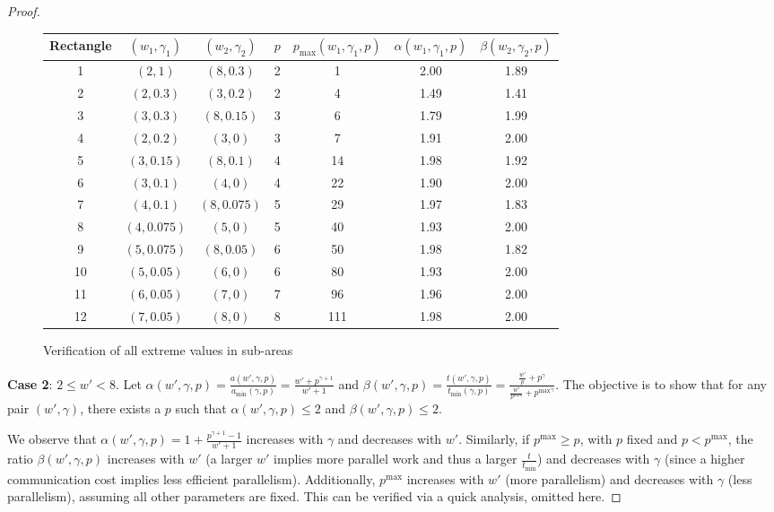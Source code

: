 \documentclass{article}
\begin{document}
\begin{proof}
\begin{figure}
\center
\begin{tabular}{|c|c|c|c|c|c|c|}
\hline
Rectangle & $(w_1,\gamma_1)$ & $(w_2,\gamma_2)$ & $p$ & $p_{\max}(w_1,\gamma_1,p) $& $\alpha(w_1,\gamma_1,p)$ & $\beta(w_2,\gamma_2,p)$ \\
\hline
1 & $(2,1)$ & $(8,0.3)$ & 2 &1 & 2.00 & 1.89 \\
2 & $(2,0.3)$ & $(3,0.2)$ & 2 &4 & 1.49 & 1.41 \\
3 & $(3,0.3)$ & $(8,0.15)$ & 3 &6 & 1.79 & 1.99 \\
4 & $(2,0.2)$ & $(3,0)$ & 3 &7 & 1.91 & 2.00 \\
5 & $(3,0.15)$ & $(8,0.1)$ & 4 &14 & 1.98 & 1.92 \\
6 & $(3,0.1)$ & $(4,0)$ & 4 &22 & 1.90 & 2.00 \\
7 & $(4,0.1)$ & $(8,0.075)$ & 5 &29 & 1.97 & 1.83 \\
8 & $(4,0.075)$ & $(5,0)$ & 5 &40 & 1.93 & 2.00 \\
9 & $(5,0.075)$ & $(8,0.05)$ & 6 &50 & 1.98 & 1.82 \\
10 & $(5,0.05)$ & $(6,0)$ & 6 &80 & 1.93 & 2.00 \\
11 & $(6,0.05)$ & $(7,0)$ & 7 &96 & 1.96 & 2.00 \\
12 & $(7,0.05)$ & $(8,0)$ & 8 &111 & 1.98 & 2.00 \\
\hline
\end{tabular}
\caption{Verification of all extreme values in sub-areas}
\label{fig.verif}
\end{figure}\textbf{Case 2}: $2 \leq w' < 8$.  
Let  $\alpha(w',\gamma,p)= \frac{a(w',\gamma,p)}{a_{\min}(\gamma,p)} = \frac{w' + p^{\gamma+1}}{w' + 1}$ and $\beta(w',\gamma,p) = \frac{t(w',\gamma,p)}{t_{\min}(\gamma,p)} = \frac{\frac{w'}{p} + p^\gamma}{\frac{w'}{p^{\max}} + {p^{\max}}^\gamma}$. The objective is to show that for any pair $(w',\gamma)$, there exists a $p$ such that $\alpha(w',\gamma,p) \leq 2$ and $\beta(w',\gamma,p) \leq 2$.

We observe that $\alpha(w',\gamma,p) = 1 + \frac{p^{\gamma+1} - 1}{w' + 1}$ increases with $\gamma$ and decreases with $w'$.  
Similarly, if $p^{\max} \geq p$, with $p$ fixed and $p < p^{\max}$, the ratio $\beta(w',\gamma,p)$ increases with $w'$ (a larger $w'$ implies more parallel work and thus a larger $\frac{t}{t_{\min}}$) and decreases with $\gamma$ (since a higher communication cost implies less efficient parallelism).  
Additionally, $p^{\max}$ increases with $w'$ (more parallelism) and decreases with $\gamma$ (less parallelism), assuming all other parameters are fixed. This can be verified via a quick analysis, omitted here.


\end{proof}
\end{document}
